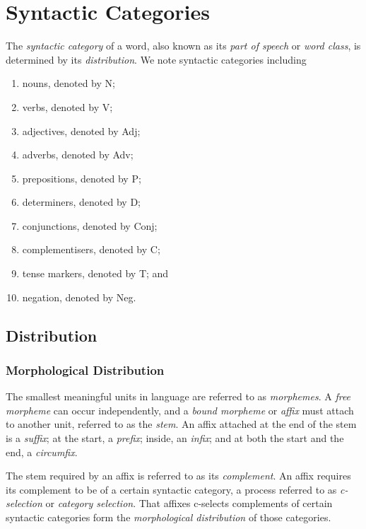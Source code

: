 



\section{Syntactic Categories}

The \emph{syntactic category} of a word, also known as its \emph{part of speech} or \emph{word class}, is determined by
its \emph{distribution}. We note syntactic categories including
\begin{enumerate}
  \item nouns, denoted by N;
  \item verbs, denoted by V;
  \item adjectives, denoted by Adj;
  \item adverbs, denoted by Adv;
  \item prepositions, denoted by P;
  \item determiners, denoted by D;
  \item conjunctions, denoted by Conj;
  \item complementisers, denoted by C;
  \item tense markers, denoted by T; and
  \item negation, denoted by Neg.
\end{enumerate}

\subsection{Distribution}

\subsubsection{Morphological Distribution}

The smallest meaningful units in language are referred to as \emph{morphemes}. A \emph{free morpheme} can occur
independently, and a \emph{bound morpheme} or \emph{affix} must attach to another unit, referred to as the \emph{stem}.
An affix attached at the end of the stem is a \emph{suffix}; at the start, a \emph{prefix}; inside, an \emph{infix}; and
at both the start and the end, a \emph{circumfix}.

The stem required by an affix is referred to as its \emph{complement}. An affix requires its complement to be of a
certain syntactic category, a process referred to as \emph{c-selection} or \emph{category selection}. That affixes
c-selects complements of certain syntactic categories form the \emph{morphological distribution} of those categories.

